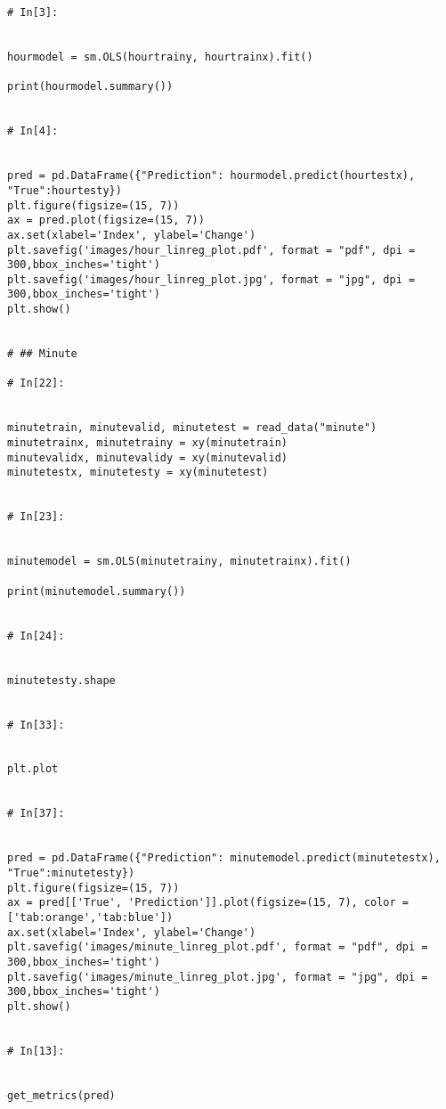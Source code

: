 \documentclass[12pt,a4paper]{article}
\begin{document}
\begin{lstlisting}[breaklines]
# In[3]:


hourmodel = sm.OLS(hourtrainy, hourtrainx).fit()

print(hourmodel.summary())


# In[4]:


pred = pd.DataFrame({"Prediction": hourmodel.predict(hourtestx), "True":hourtesty})
plt.figure(figsize=(15, 7))
ax = pred.plot(figsize=(15, 7))
ax.set(xlabel='Index', ylabel='Change')
plt.savefig('images/hour_linreg_plot.pdf', format = "pdf", dpi = 300,bbox_inches='tight')
plt.savefig('images/hour_linreg_plot.jpg', format = "jpg", dpi = 300,bbox_inches='tight')
plt.show()


# ## Minute

# In[22]:


minutetrain, minutevalid, minutetest = read_data("minute")
minutetrainx, minutetrainy = xy(minutetrain)
minutevalidx, minutevalidy = xy(minutevalid)
minutetestx, minutetesty = xy(minutetest)


# In[23]:


minutemodel = sm.OLS(minutetrainy, minutetrainx).fit()

print(minutemodel.summary())


# In[24]:


minutetesty.shape


# In[33]:


plt.plot


# In[37]:


pred = pd.DataFrame({"Prediction": minutemodel.predict(minutetestx), "True":minutetesty})
plt.figure(figsize=(15, 7))
ax = pred[['True', 'Prediction']].plot(figsize=(15, 7), color = ['tab:orange','tab:blue'])
ax.set(xlabel='Index', ylabel='Change')
plt.savefig('images/minute_linreg_plot.pdf', format = "pdf", dpi = 300,bbox_inches='tight')
plt.savefig('images/minute_linreg_plot.jpg', format = "jpg", dpi = 300,bbox_inches='tight')
plt.show()


# In[13]:


get_metrics(pred)


\end{lstlisting}
\end{document}
